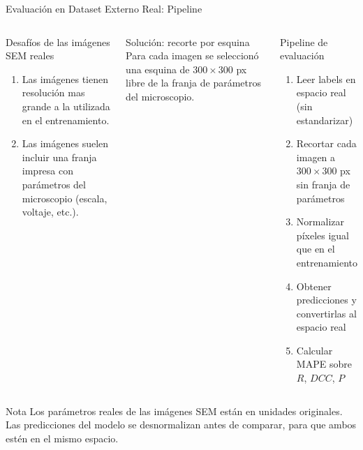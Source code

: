 \begin{frame}{Evaluación en Dataset Externo Real: Pipeline}
    \begin{columns}[T]

        \begin{alertblock}{Desafíos de las imágenes SEM reales}
            \begin{enumerate}
                \item Las imágenes tienen resolución mas grande a la utilizada en el entrenamiento.
                \item Las imágenes suelen incluir una franja impresa con parámetros del microscopio (escala, voltaje, etc.).
            \end{enumerate}
        \end{alertblock}

        \begin{block}{Solución: recorte por esquina}
            Para cada imagen se seleccionó una esquina de $300\times300$ px libre de la franja de parámetros del microscopio.
        \end{block}


        \begin{exampleblock}{Pipeline de evaluación}
            \small
            \begin{enumerate}
                \item Leer labels en espacio real (sin estandarizar)
                \item Recortar cada imagen a $300\times300$ px sin franja de parámetros
                \item Normalizar píxeles igual que en el entrenamiento
                \item Obtener predicciones y convertirlas al espacio real
                \item Calcular MAPE sobre $R$, $DCC$, $P$
            \end{enumerate}
        \end{exampleblock}

    \end{columns}

    \begin{block}{Nota}
        Los parámetros reales de las imágenes SEM están en unidades originales. Las predicciones del modelo se desnormalizan antes de comparar, para que ambos estén en el mismo espacio.
    \end{block}

\end{frame}

